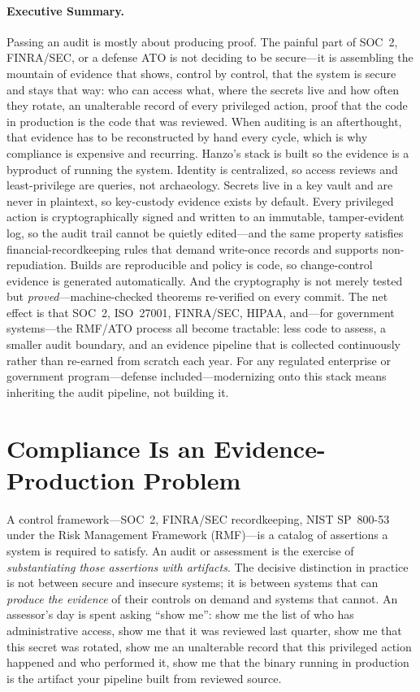 \documentclass[11pt,letterpaper]{article}
\begin{document}
\paragraph{Executive Summary.}
Passing an audit is mostly about producing proof. The painful part of SOC~2,
FINRA/SEC, or a defense ATO is not deciding to be secure---it is assembling the
mountain of evidence that shows, control by control, that the system is secure and
stays that way: who can access what, where the secrets live and how often they
rotate, an unalterable record of every privileged action, proof that the code in
production is the code that was reviewed. When auditing is an afterthought, that
evidence has to be reconstructed by hand every cycle, which is why compliance is
expensive and recurring. Hanzo's stack is built so the evidence is a byproduct of
running the system. Identity is centralized, so access reviews and least-privilege
are queries, not archaeology. Secrets live in a key vault and are never in
plaintext, so key-custody evidence exists by default. Every privileged action is
cryptographically signed and written to an immutable, tamper-evident log, so the
audit trail cannot be quietly edited---and the same property satisfies
financial-recordkeeping rules that demand write-once records and supports
non-repudiation. Builds are reproducible and policy is code, so change-control
evidence is generated automatically. And the cryptography is not merely tested but
\emph{proved}---machine-checked theorems re-verified on every commit. The net effect
is that SOC~2, ISO~27001, FINRA/SEC, HIPAA, and---for government systems---the
RMF/ATO process all become tractable: less code to
assess, a smaller audit boundary, and an evidence pipeline that is collected
continuously rather than re-earned from scratch each year. For any regulated
enterprise or government program---defense included---modernizing onto this stack
means inheriting the audit pipeline, not building it.

\tableofcontents
\newpage

\section{Compliance Is an Evidence-Production Problem}

A control framework---SOC~2, FINRA/SEC recordkeeping, NIST SP~800-53 under the Risk
Management Framework (RMF)---is a catalog of assertions a system is required to
satisfy. An audit or assessment is the exercise of \emph{substantiating those
assertions with artifacts}. The decisive distinction in practice is not between
secure and insecure systems; it is between systems that can \emph{produce the
evidence} of their controls on demand and systems that cannot. An assessor's day is
spent asking ``show me'': show me the list of who has administrative access, show me
that it was reviewed last quarter, show me that this secret was rotated, show me an
unalterable record that this privileged action happened and who performed it, show
me that the binary running in production is the artifact your pipeline built from
reviewed source.
\end{document}
